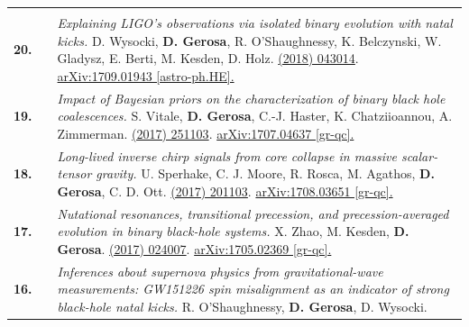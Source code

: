 {\begin{longtable}{rp{0.3cm}p{15.8cm}}
\vspace{0.09cm}\\
%
\textbf{20.} & & \textit{Explaining LIGO's observations via isolated binary evolution with natal kicks.}
\newline{}
D. Wysocki, \textbf{D. Gerosa}, R. O'Shaughnessy, K. Belczynski, W. Gladysz, E. Berti, M. Kesden, D. Holz.
\newline{}
\href{https://journals.aps.org/prd/abstract/10.1103/PhysRevD.97.043014}{\prd 97 (2018) 043014}. \href{https://arxiv.org/abs/1709.01943}{arXiv:1709.01943 [astro-ph.HE].}
\vspace{0.09cm}\\
%
\textbf{19.} & & \textit{Impact of Bayesian priors on the characterization of binary black hole coalescences.}
\newline{}
S. Vitale, \textbf{D. Gerosa}, C.-J. Haster, K. Chatziioannou, A. Zimmerman.
\newline{}
\href{http://dx.doi.org/10.1103/PhysRevLett.119.251103}{\prl 119 (2017) 251103}. \href{https://arxiv.org/abs/1707.04637}{arXiv:1707.04637 [gr-qc].}
\vspace{0.09cm}\\
%
\textbf{18.} & & \textit{Long-lived inverse chirp signals from core collapse in massive scalar-tensor gravity.}
\newline{}
U. Sperhake, C. J. Moore, R. Rosca, M. Agathos, \textbf{D. Gerosa}, C. D. Ott.
\newline{}
\href{http://dx.doi.org/10.1103/PhysRevLett.119.201103}{\prl 119 (2017) 201103}. \href{https://arxiv.org/abs/1708.03651}{arXiv:1708.03651 [gr-qc].}
\vspace{0.09cm}\\
%
\textbf{17.} & & \textit{Nutational resonances, transitional precession, and precession-averaged evolution in binary black-hole systems.}
\newline{}
X. Zhao, M. Kesden, \textbf{D. Gerosa}.
\newline{}
\href{http://dx.doi.org/10.1103/PhysRevD.96.024007}{\prd 96 (2017) 024007}. \href{https://arxiv.org/abs/1705.02369}{arXiv:1705.02369 [gr-qc].}
\vspace{0.09cm}\\
%
\textbf{16.} & & \textit{Inferences about supernova physics from gravitational-wave measurements: GW151226 spin misalignment as an indicator of strong black-hole natal kicks.}
\newline{}
R. O'Shaughnessy, \textbf{D. Gerosa}, D. Wysocki.
\newline{}

\end{longtable}}
